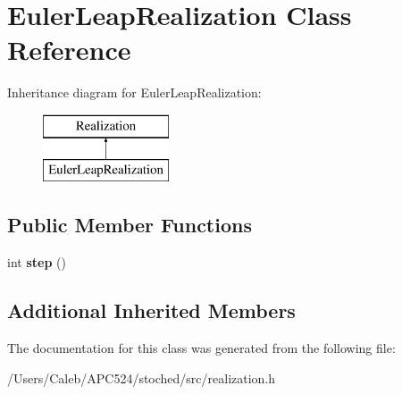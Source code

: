 \hypertarget{class_euler_leap_realization}{}\section{Euler\+Leap\+Realization Class Reference}
\label{class_euler_leap_realization}
Inheritance diagram for Euler\+Leap\+Realization\+:\begin{figure}[H]
\begin{center}
\leavevmode
\includegraphics[height=2.000000cm]{class_euler_leap_realization}
\end{center}
\end{figure}
\subsection*{Public Member Functions}
\begin{DoxyCompactItemize}
\item 
\mbox{\label{class_euler_leap_realization_ab72bfdc22d6101f2c10227b27a5121f1}} 
int {\bfseries step} ()
\end{DoxyCompactItemize}
\subsection*{Additional Inherited Members}


The documentation for this class was generated from the following file\+:\begin{DoxyCompactItemize}
\item 
/\+Users/\+Caleb/\+A\+P\+C524/stoched/src/realization.\+h\end{DoxyCompactItemize}
